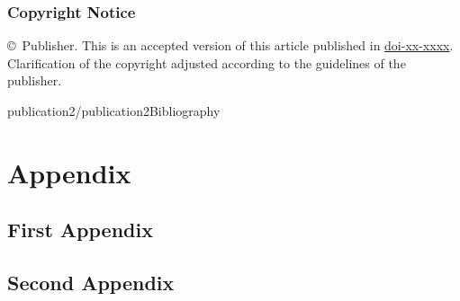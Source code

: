 \documentclass[12pt, a4paper, unicode]{report}
\begin{document}
    \section*{Copyright Notice}
    \copyright \the\year\ Publisher. This is an accepted version of this article published in \href{https://doi.org}{doi-xx-xxxx}. Clarification of the copyright adjusted according to the guidelines of the publisher.
    \clearpage
    
    
    
    {publication2/publication2}{Bibliography}
    
    \stopcontents[p2]
    \stopcontents[p2ch2]
    \stopcontents[tocpart2]
    \endgroup


\resumecontents[tocappendix]

\appendix
\cleardoublepage
{}
\part*{Appendix}

\chapter{First Appendix}

\chapter{Second Appendix}
\end{document}
